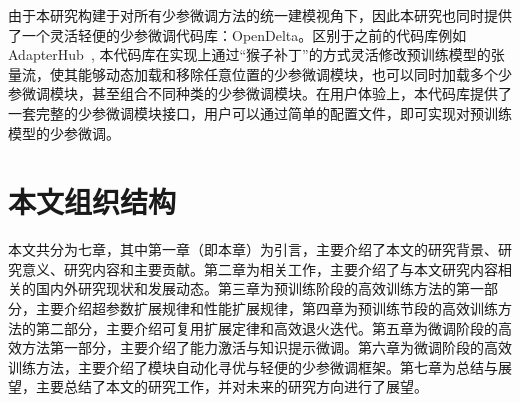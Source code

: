 由于本研究构建于对所有少参微调方法的统一建模视角下，因此本研究也同时提供了一个灵活轻便的少参微调代码库：OpenDelta。区别于之前的代码库例如AdapterHub~\cite{pfeiffer2020adapterhub}, 本代码库在实现上通过“猴子补丁”的方式灵活修改预训练模型的张量流，使其能够动态加载和移除任意位置的少参微调模块，也可以同时加载多个少参微调模块，甚至组合不同种类的少参微调模块。在用户体验上，本代码库提供了一套完整的少参微调模块接口，用户可以通过简单的配置文件，即可实现对预训练模型的少参微调。



\section{本文组织结构}
本文共分为七章，其中第一章（即本章）为引言，主要介绍了本文的研究背景、研究意义、研究内容和主要贡献。第二章为相关工作，主要介绍了与本文研究内容相关的国内外研究现状和发展动态。第三章为预训练阶段的高效训练方法的第一部分，主要介绍超参数扩展规律和性能扩展规律，第四章为预训练节段的高效训练方法的第二部分，主要介绍可复用扩展定律和高效退火迭代。第五章为微调阶段的高效方法第一部分，主要介绍了能力激活与知识提示微调。第六章为微调阶段的高效训练方法，主要介绍了模块自动化寻优与轻便的少参微调框架。第七章为总结与展望，主要总结了本文的研究工作，并对未来的研究方向进行了展望。

